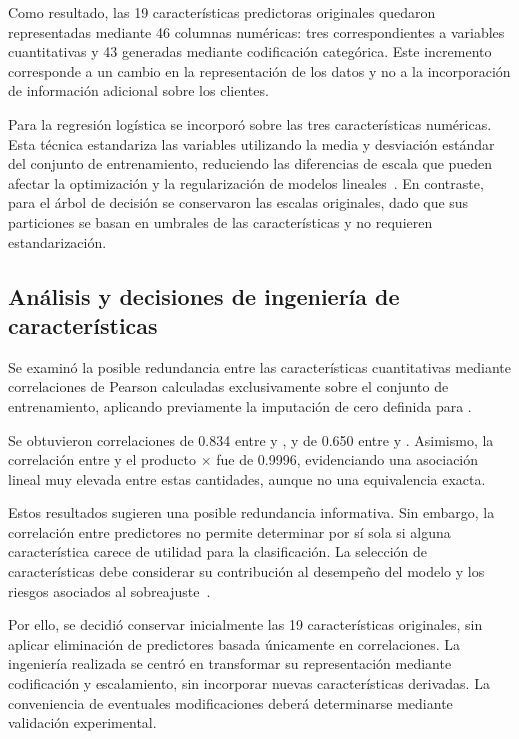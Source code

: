 Como resultado, las 19 características predictoras originales quedaron representadas mediante 46
columnas numéricas: tres correspondientes a variables cuantitativas y 43 generadas mediante
codificación categórica. Este incremento corresponde a un cambio en la representación de los datos y
no a la incorporación de información adicional sobre los clientes.

Para la regresión logística se incorporó  sobre las tres características numéricas.
Esta técnica estandariza las variables utilizando la media y desviación estándar del conjunto de
entrenamiento, reduciendo las diferencias de escala que pueden afectar la optimización y la
regularización de modelos lineales~\cite{standardscaler}. En contraste, para el árbol de decisión se
conservaron las escalas originales, dado que sus particiones se basan en umbrales de las
características y no requieren estandarización.

\subsection{Análisis y decisiones de ingeniería de características}
Se examinó la posible redundancia entre las características cuantitativas mediante correlaciones de
Pearson calculadas exclusivamente sobre el conjunto de entrenamiento, aplicando previamente la
imputación de cero definida para .

Se obtuvieron correlaciones de 0.834 entre  y , y de 0.650 entre
 y . Asimismo, la correlación entre  y el
producto  $\times$  fue de 0.9996, evidenciando una asociación lineal
muy elevada entre estas cantidades, aunque no una equivalencia exacta.

Estos resultados sugieren una posible redundancia informativa. Sin embargo, la correlación entre
predictores no permite determinar por sí sola si alguna característica carece de utilidad para la
clasificación. La selección de características debe considerar su contribución al desempeño del
modelo y los riesgos asociados al sobreajuste~\cite{kuhn}.

Por ello, se decidió conservar inicialmente las 19 características originales, sin aplicar
eliminación de predictores basada únicamente en correlaciones. La ingeniería realizada se centró en
transformar su representación mediante codificación y escalamiento, sin incorporar nuevas
características derivadas. La conveniencia de eventuales modificaciones deberá determinarse mediante
validación experimental.

